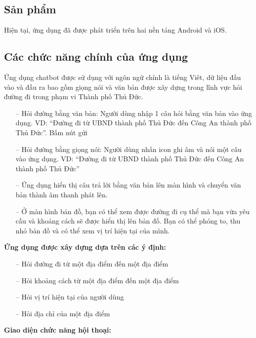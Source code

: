 \subsection{Sản phẩm}
Hiện tại, ứng dụng đã được phát triển trên hai nền tảng Android và iOS.  

\subsection{Các chức năng chính của ứng dụng}

Ứng dụng chatbot được sử dụng với ngôn ngữ chính là tiếng Viêt, dữ liệu đầu vào và đầu ra bao gồm giọng nói và văn bản được xây dựng trong lĩnh vực hỏi đường đi trong phạm vi Thành phố Thủ Đức.
\begin{itemize}
    \item[--] Hỏi đường bằng văn bản: Người dùng nhập 1 câu hỏi bằng văn bản vào ứng dụng. VD: “Đường đi từ UBND thành phố Thủ Đức đến Công An thành phố Thủ Đức”. Bấm nút gửi
    \item[--] Hỏi đường bằng giọng nói: Người dùng nhấn icon ghi âm và nói một câu vào ứng dụng. VD: “Đường đi từ UBND thành phố Thủ Đức đến Công An thành phố Thủ Đức”
    \item[--] Ứng dụng hiển thị câu trả lời bằng văn bản lên màn hình và chuyển văn bản thành âm thanh phát lên.
    \item[--] Ở màn hình bản đồ, bạn có thể xem được đường đi cụ thể mà bạn vừa yêu cầu và khoảng cách sẽ được hiển thị lên bản đồ. Bạn có thể phóng to, thu nhỏ bản đồ và có thể xem vị trí hiện tại của mình.
\end{itemize}
\textbf{Ứng dụng được xây dựng dựa trên các ý định:}
\begin{itemize}
    \item[--] Hỏi đường đi từ một địa điểm đến một địa điểm
    \item[--] Hỏi khoảng cách từ một địa điểm đến một địa điểm
    \item[--] Hỏi vị trí hiện tại của người dùng
    \item[--] Hỏi địa chỉ của một địa điểm  
\end{itemize}
\textbf{Giao diện chức năng hội thoại:}

